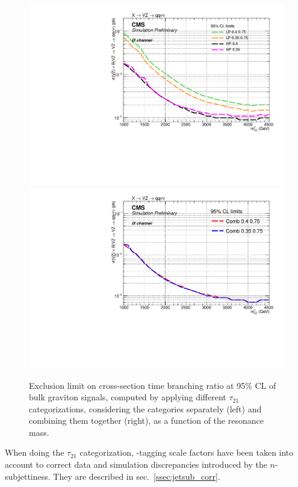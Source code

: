  \begin{figure}[!htb]
   \begin{center}

     \includegraphics[width=.5\textwidth]{TestPurity/Exclusion_purityTest_LPHP_test.pdf}%
     \includegraphics[width=.5\textwidth]{TestPurity/Exclusion_purityTest_comb_test.pdf}
   \end{center}
   \caption{Exclusion limit on cross-section time branching ratio at 95\% CL of bulk graviton signals, computed by applying different $\tau_{21}$ categorizations, considering the categories separately (left) and combining them together (right), as a function of the resonance mass.}
   \label{fig:test_exclusion}
 \end{figure}


\noindent When doing the $\tau_{21}$ categorization, \V-tagging scale factors have been taken into account to correct data and simulation discrepancies introduced by the $n$-subjettiness. They are described in sec.~\ref{ssec:jetsub_corr}.

